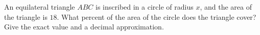 An equilateral triangle $ABC$ is inscribed in a circle of radius $x$, and the area of the triangle is $18$. What percent of the area of the circle does the triangle cover? Give the exact value and a decimal approximation.
